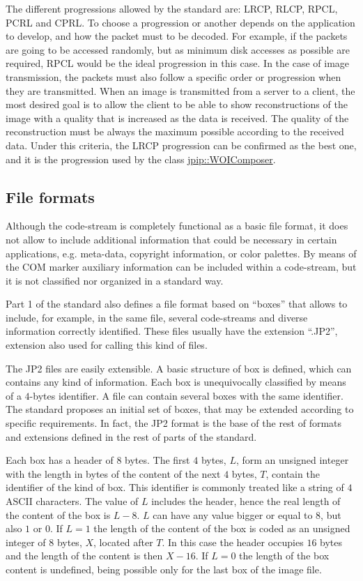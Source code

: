 The different progressions allowed by the standard are: LRCP, RLCP,
RPCL, PCRL and CPRL. To choose a progression or another depends on 
the application to
develop, and how the packet must to be decoded. For example,
if the packets are going to be accessed randomly, but 
as minimum disk accesses as possible are required, RPCL would
be the ideal progression in this case. 
In the case of image transmission, the packets must also follow a
specific order or progression when they are transmitted. 
When an image is transmitted from a server to a client, the most
desired goal is to allow the client to be able to show reconstructions
of the image with a quality that is increased as the data is received.
The quality of the reconstruction must be always the maximum possible
according to the received data. Under this criteria, the LRCP progression
can be confirmed as the best one, and it is the progression used by
the class \hyperlink{classjpip_1_1WOIComposer}{jpip::WOIComposer}.

\subsection{File formats}

Although the code-stream is completely functional as a basic
file format, it does not allow to include additional information
that could be necessary in certain applications, e.g. meta-data,
copyright information, or color palettes. By means of the COM
marker auxiliary information can be included within a 
code-stream, but it is not classified nor organized in
a standard way.

Part 1 of the standard also defines a file format based on ``boxes'' that
allows to include, for example, in the same file, several code-streams
and diverse information correctly identified. These files usually have
the extension ``.JP2'', extension also used for calling this kind
of files.

The JP2 files are easily extensible. A basic structure of box is defined,
which can contains any kind of information. Each box is unequivocally 
classified by means of a $4$-bytes identifier. A file can contain
several boxes with the same identifier. The standard proposes an
initial set of boxes, that may be extended  according to specific
requirements. In fact, the JP2 format is the base of the rest of
formats and extensions defined in the rest of parts of the standard.

Each box has a header of $8$ bytes. The first $4$ bytes, $L$, form
an unsigned integer with the length in bytes of the content of the
next $4$ bytes, $T$, contain the identifier of the kind of box. This
identifier is commonly treated like a string of $4$ ASCII characters.
The value of $L$ includes the header, hence the real length of the
content of the box is $L - 8$. $L$ can have any value bigger or
equal to $8$, but also $1$ or $0$. If $L = 1$ the length of the
content of the box is coded as an unsigned integer of $8$ bytes, $X$,
located after $T$. In this case the header occupies $16$ bytes and
the length of the content is then $X - 16$. If $L = 0$ the
length of the box content is undefined, being possible only for the
last box of the image file.

